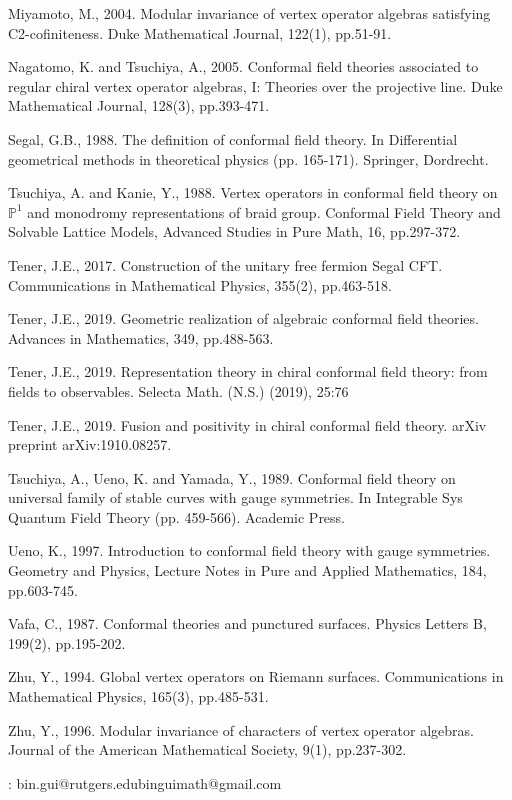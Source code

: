 \documentclass[12pt,a4paper,notitlepage]{article}
\theoremstyle{definition}
\theoremstyle{plain}
\newcommand{\Pbb}{\mathbb P}
\numberwithin{equation}{section}
\begin{document}
\begin{thebibliography}{999999}
Miyamoto, M., 2004. Modular invariance of vertex operator algebras satisfying C2-cofiniteness. Duke Mathematical Journal, 122(1), pp.51-91.


Nagatomo, K. and Tsuchiya, A., 2005. Conformal field theories associated to regular chiral vertex operator algebras, I: Theories over the projective line. Duke Mathematical Journal, 128(3), pp.393-471.

Segal, G.B., 1988. The definition of conformal field theory. In Differential geometrical methods in theoretical physics (pp. 165-171). Springer, Dordrecht.

Tsuchiya, A. and Kanie, Y., 1988. Vertex operators in conformal field theory on $\Pbb^1$ and monodromy representations of braid group. Conformal Field Theory and Solvable Lattice Models, Advanced Studies in Pure Math, 16, pp.297-372.

Tener, J.E., 2017. Construction of the unitary free fermion Segal CFT. Communications in Mathematical Physics, 355(2), pp.463-518.



Tener, J.E., 2019. Geometric realization of algebraic conformal field theories. Advances in Mathematics, 349, pp.488-563.


Tener, J.E., 2019. Representation theory in chiral conformal field theory: from fields to
observables. Selecta Math. (N.S.) (2019), 25:76

Tener, J.E., 2019. Fusion and positivity in chiral conformal field theory. arXiv preprint arXiv:1910.08257.
		

Tsuchiya, A., Ueno, K. and Yamada, Y., 1989. Conformal field theory on universal family of stable curves with gauge symmetries. In Integrable Sys Quantum Field Theory (pp. 459-566). Academic Press.
	
Ueno, K., 1997. Introduction to conformal field theory with gauge symmetries. Geometry and Physics, Lecture Notes in Pure and Applied Mathematics, 184, pp.603-745.

		

Vafa, C., 1987. Conformal theories and punctured surfaces. Physics Letters B, 199(2), pp.195-202.	
		
Zhu, Y., 1994. Global vertex operators on Riemann surfaces. Communications in Mathematical Physics, 165(3), pp.485-531.
		
Zhu, Y., 1996. Modular invariance of characters of vertex operator algebras. Journal of the American Mathematical Society, 9(1), pp.237-302.
		
		
		
		
		
	\end{thebibliography}
	
	: bin.gui@rutgers.edu\qquad binguimath@gmail.com
\end{document}
